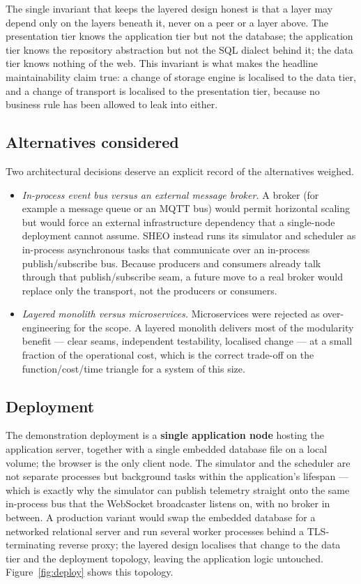 The single invariant that keeps the layered design honest is that a layer may depend
only on the layers beneath it, never on a peer or a layer above. The presentation
tier knows the application tier but not the database; the application tier knows the
repository abstraction but not the SQL dialect behind it; the data tier knows nothing
of the web. This invariant is what makes the headline maintainability claim true: a
change of storage engine is localised to the data tier, and a change of transport is
localised to the presentation tier, because no business rule has been allowed to leak
into either.

\subsection{Alternatives considered}

Two architectural decisions deserve an explicit record of the alternatives weighed.

\begin{itemize}[leftmargin=1.4em]
  \item \emph{In-process event bus versus an external message broker.} A broker
  (for example a message queue or an MQTT bus) would permit horizontal scaling but
  would force an external infrastructure dependency that a single-node deployment
  cannot assume. SHEO instead runs its simulator and scheduler as in-process
  asynchronous tasks that communicate over an in-process publish/subscribe bus.
  Because producers and consumers already talk through that publish/subscribe seam,
  a future move to a real broker would replace only the transport, not the
  producers or consumers.
  \item \emph{Layered monolith versus microservices.} Microservices were rejected as
  over-engineering for the scope. A layered monolith delivers most of the modularity
  benefit --- clear seams, independent testability, localised change --- at a small
  fraction of the operational cost, which is the correct trade-off on the
  function/cost/time triangle for a system of this size.
\end{itemize}

\subsection{Deployment}

The demonstration deployment is a \textbf{single application node} hosting the
application server, together with a single embedded database file on a local volume;
the browser is the only client node. The simulator and the scheduler are not separate
processes but background tasks within the application's lifespan --- which is exactly
why the simulator can publish telemetry straight onto the same in-process bus that the
WebSocket broadcaster listens on, with no broker in between. A production variant would
swap the embedded database for a networked relational server and run several worker
processes behind a TLS-terminating reverse proxy; the layered design localises that
change to the data tier and the deployment topology, leaving the application logic
untouched. Figure~\ref{fig:deploy} shows this topology.

